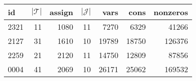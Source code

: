 \begin{tabular}{lrrrrrr}
\toprule
   id &  $|\mathcal{T}|$ &  assign &  $|\mathcal{J}|$ &  vars &  cons &  nonzeros \\
\midrule
 2321 &               11 &    1080 &               11 &  7270 &  6329 &     41266 \\
 2127 &               31 &    1610 &               10 & 19789 & 18750 &    126376 \\
 2259 &               21 &    2120 &               11 & 14750 & 12809 &     87856 \\
 0004 &               41 &    2069 &               10 & 26171 & 25062 &    169532 \\
\bottomrule
\end{tabular}
